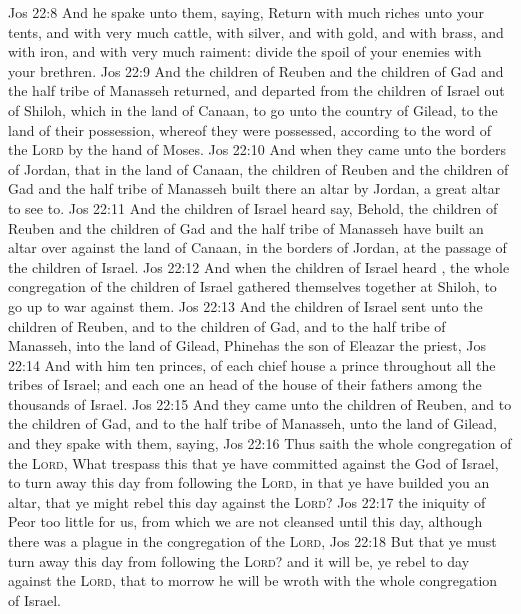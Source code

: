 \vs Jos 22:8 And he spake unto them, saying, Return with much riches unto your tents, and with very much cattle, with silver, and with gold, and with brass, and with iron, and with very much raiment: divide the spoil of your enemies with your brethren.
\vs Jos 22:9 And the children of Reuben and the children of Gad and the half tribe of Manasseh returned, and departed from the children of Israel out of Shiloh, which  in the land of Canaan, to go unto the country of Gilead, to the land of their possession, whereof they were possessed, according to the word of the \textsc{Lord} by the hand of Moses.
\vs Jos 22:10 And when they came unto the borders of Jordan, that  in the land of Canaan, the children of Reuben and the children of Gad and the half tribe of Manasseh built there an altar by Jordan, a great altar to see to.
\vs Jos 22:11 And the children of Israel heard say, Behold, the children of Reuben and the children of Gad and the half tribe of Manasseh have built an altar over against the land of Canaan, in the borders of Jordan, at the passage of the children of Israel.
\vs Jos 22:12 And when the children of Israel heard , the whole congregation of the children of Israel gathered themselves together at Shiloh, to go up to war against them.
\vs Jos 22:13 And the children of Israel sent unto the children of Reuben, and to the children of Gad, and to the half tribe of Manasseh, into the land of Gilead, Phinehas the son of Eleazar the priest,
\vs Jos 22:14 And with him ten princes, of each chief house a prince throughout all the tribes of Israel; and each one  an head of the house of their fathers among the thousands of Israel.
\vs Jos 22:15 And they came unto the children of Reuben, and to the children of Gad, and to the half tribe of Manasseh, unto the land of Gilead, and they spake with them, saying,
\vs Jos 22:16 Thus saith the whole congregation of the \textsc{Lord}, What trespass  this that ye have committed against the God of Israel, to turn away this day from following the \textsc{Lord}, in that ye have builded you an altar, that ye might rebel this day against the \textsc{Lord}?
\vs Jos 22:17  the iniquity of Peor too little for us, from which we are not cleansed until this day, although there was a plague in the congregation of the \textsc{Lord},
\vs Jos 22:18 But that ye must turn away this day from following the \textsc{Lord}? and it will be,  ye rebel to day against the \textsc{Lord}, that to morrow he will be wroth with the whole congregation of Israel.
